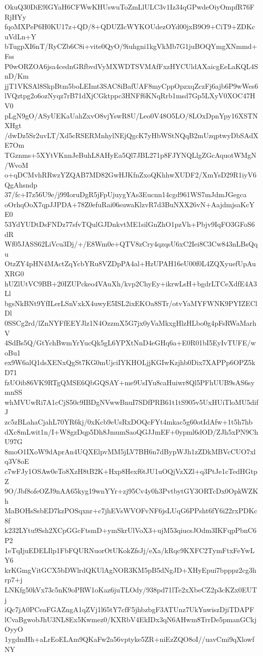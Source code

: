 OkuQ30DiE9lGYaH6CFWwKHUswuToZmLlULC3v1Iz34qGPwdeOiyOmpfR76FRjHYy
fqoMXPeP6H0KU17z+QD/8+QDUZIcWYKOUdezOYd00jxB9O9+CiT9+ZDKcuVdLn+Y
bTugpXI6nT/RyCZb6C8i+vite0QyO/9iuhgni1kgVkMb7G1juBOQYmgXNmmd+Fss
P0wORZOA6jsa4cednGRfbvdVyMXWDTSVMAfFxzHYCUldAXaicgEeLaKQL4SnD/Km
jjT1VKSAl8SkpBtm5boLEImt3SAC8iBafUAF8myCppOpzxqZczFj6ajb6P9wWes6
lVQztpg2o6ozNyqz7rB71dXjCGktppc3HNFf6KNqRrb1msd7Gp5LXyV0XOC47HV0
pLgN9gO/ASyUEKaUahZxvO8vjYswR8U/Leo0V48O5LO/8LOxDpnYpy16XSTNXHgt
/dwDz5Sr2uvLT/Xd5cRSERMnhylNEjQgcK7yHbWStNQqB2mUzqptwyDbSAdXE7Om
TGznms+5XYtVKnnJeBuhL8AHyEa5Ql7JBL271p8FJYNQLlgZGcAquotWMgN/WvoM
o+qDCMvhRRwzYZQAB7MD82GwHJKfnZxoQKhhwXUDF2/XmYsD29R1iyV6QgAhsndp
37/fc+I7z56U9e/j99IoruDgR5jFpUjuygYAs3Eucnn14cgd961WS7mJdmJGegca
oOrhqOoX7qpJJPDA+78Z0efuRai06suwaKlzvR7d3BuNXX26vN+AajdmjsaKcYE0
53YdYUDtDsFNDz77sfvTQulGJDnkvtME1silGnZhO1pzVh+Pbjv9IqFO3GFoS6dR
Wf05JASS62LiVcu3Dj/+/E8Wm0e+QTV8zCry4qzqsU6xC2Iei8C3Cw843nLBsQqu
OtzZY4pHN4MActZqYcbYRu8VZDpPA4al+HzUPAH16eU00f0L4ZQXyuefUpAuXRG0
hUZlUtVC9BB+20IZUPckeo4VAuXh/kvp2ChyEy+ikrwLsH+bgdrLTCeXdfE4A3Ll
bgsNkBNt9YfILerLSnVxkX4uwyE5ISL2ixEKOa8STr/otvYaMYFWNK9PYIZEClDl
0SSCg2rd/lZnNYFfEEYJlz1N4OzzmX5G7jx0yVaMkxgHlzHLbo0g4pFsRWaMarhV
4SdBs5Q/GtYchBwmYrYucQk5gL6YPXtNnD4eGHq6a+E0R01bI5EyIvTUFE/woBu1
ex9W6alQ1dsXENxQgSt7KG0mUjciIYKHOLjjKGIwKzjhb0Dix7XAPPp6OPZ5kD71
fzUOib86VK9RTgQMSE6QbGQSAY+me9UsIYu8caHuiwr8Ql5PFhUUB9sAS6symnSS
whMVUwRi7A1cCjS50c9IBDgNVwwBnuI7SDfPRB61t1tS905v5UxHUiTloMU5difJ
zc5zBLahaCjahL70YR6kj/0xKcb9eUsRxDOQcFYt4mkac5g60otIdAfw+1t5h7hb
dXc8mLwit1n/I+W8gzDqp5Dh8JmumSaoQGJJmEF+0ypml6dOD/ZJh5xPN9ChU97G
8moO1IXoW9dAprAn4UQXElpvMM5jLV7BH6n7dBypWJh1zZDkMBVcCUO7xlq3V8oE
c7wFJy1OSAw0eTo8XzH8tB2K+Hxp8Hexf6tJU1uOQjVzXZl+q3PtJe1cTedHGtpZ
9O/Jbf8ofeOZJ9nAA65kyg19wnYYr+zj95Cv4y0h3PvtbytGY3ORTcDx0OpkWZKh
MaBOHsSsbED7kzPOSqxnr+c7jhEVsWVOFvNF6jsLUqG6PPsht6fY6i22rxPDKc8f
k232LYtu9Ssh2XCpGGcFtsmD+ymSkrUlVoX3+ujM53qiucsJOdm3IKFqpPbnC6P2
1eTqIjuEDELIlp1FbFQURNuorOtUKokZfsJj/eXa/kRqc9KXFC2TymFtxFeYwLY6
krKGmgVitGCX5bDWlrdQKUlAgNOR3KM5pB5dNgJD+XHyEpui7bpppz2cg3hrp7+j
LNKfg50kVx73c5nK9oPRW1oKaz6juTLOdy/938pd71lTe2xXbeCZ2p3cKZx0EUTj
iQc7jA0PCeaFGAZngA1qZVj1l65tY7cfF5jhbzbgF3ATUnz7UkYnwiszDjiTDAPF
lCvaBgwobJhU3NL8Ex5Kwmez0/KXRbV4EkIDx3qN6AHwm8TrrDe5pmanGCkjOyyO
1ygdmHh+aLrEoELAm9QKaFw2a56vptyke5ZR+niEzZQO8oI//uavCmi9qXlowfNY
